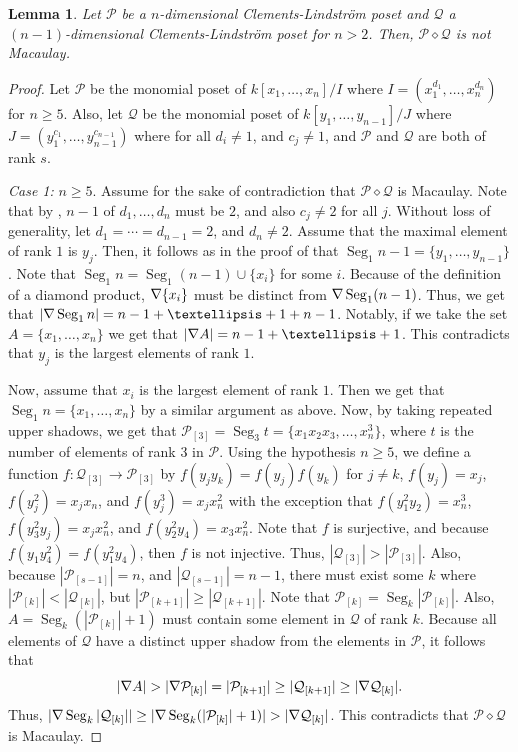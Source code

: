 \documentclass[10pt,a4paper]{amsart}
\newtheorem{lem}{Lemma}
\renewcommand{\P}{{\mathcal P}}
\newcommand{\Q}{{\mathcal Q}}
\def\Seg{\operatorname{Seg}}
\newcommand{\uSdw}{\rotatebox[origin=c]{180}{$\Delta$}}
\begin{document}
\begin{lem} \label{lem: geq 5 not Mac}
Let $\P$ be a $n$-dimensional Clements-Lindstr\"om poset and $\Q$ a $(n - 1)$-dimensional Clements-Lindstr\"om poset for $n >2$. Then, $\P \diamond \Q$ is not Macaulay.
\end{lem}

\begin{proof}
Let $\P$ be the monomial poset of $k[x_1,\dots,x_n]/I$ where $I = (x_1^{d_1},\dots,x_n^{d_n})$ for $n \geq 5$. Also, let $\Q$ be the monomial poset of $k[y_1,\dots,y_{n-1}]/J$ where $J = (y_1^{c_1},\dots,y_{n-1}^{c_{n-1}})$ where for all $d_i \neq 1$, and $c_j \neq 1$, and $\P$ and $\Q$ are both of rank $s$. 
    
\emph{Case 1:} $n \geq 5$. 
Assume for the sake of contradiction that $\P \diamond \Q$ is Macaulay. Note that by , $n-1$ of $d_1,\dots,d_n$ must be $2$, and also $c_j \neq 2$ for all $j$. Without loss of generality, let $d_1=\cdots=d_{n-1} = 2$, and $d_n \neq 2$. Assume that the maximal element of rank $1$ is $y_j$. Then, it follows as in the proof of  that $\Seg_1 n-1 = \{y_1,\dots,y_{n-1}\}$. Note that $\Seg_1 n = \Seg_1 (n-1) \cup \{x_i\}$ for some $i$. Because of the definition of a diamond product, $\uSdw \{x_i\}$ must be distinct from $\uSdw \Seg_1 (n-1)$. Thus, we get that $|\uSdw \Seg_1 n| = n - 1 + \dots + 1 + n - 1$. Notably, if we take the set $A = \{x_1,\dots,x_n\}$ we get that $|\uSdw A| = n-1 + \dots + 1$. This contradicts that $y_j$ is the largest elements of rank $1$.
    
Now, assume that $x_i$ is the largest element of rank $1$.  Then we get that $\Seg_1 n = \{x_1, \dots, x_n\}$ by a similar argument as above. Now, by taking repeated upper shadows, we get that $\P_{[3]} = \Seg_3 t = \{x_1x_2x_3,\dots,x_n^3\}$, where $t$ is the number of elements of rank $3$ in $\P$. 
Using the hypothesis $n\geq 5$, we define a function $f: \Q_{[3]} \to \P_{[3]}$ by $f(y_jy_k) = f(y_j)f(y_k)$ for $j \neq k$, $f(y_j) = x_j$, $f(y_j^2) = x_jx_n$, and $f(y_j^3) = x_jx_n^2$ with the exception that $f(y_1^2y_2) = x_n^3$, $f(y_3^2y_j) = x_jx^2_n$, and $f(y_2^2y_4) = x_3x_n^2$. Note that $f$ is surjective, and because $f(y_1y_4^2) = f(y_1^2y_4)$, then $f$ is not injective. Thus, 
$|\Q_{[3]}| > |\P_{[3]}|$. Also, because $|\P_{[s-1]}| = n$, and $|\Q_{[s-1]}| = n-1$, there must exist some $k$ where $|\P_{[k]}| < |\Q_{[k]}|$, but $|\P_{[k+1]}| \geq |\Q_{[k+1]}|$. Note that $\P_{[k]} = \Seg_k |\P_{[k]}|$. Also,  $A= \Seg_k (|\P_{[k]}| + 1)$ must contain some element in $\Q$ of rank $k$. Because all elements of $\Q$ have a distinct upper shadow from the elements in $\P$, it follows that 
\begin{equation*}
|\uSdw A| > |\uSdw \P_{[k]}| =|\P_{[k+1]}|\geq  |\Q_{[k+1]}| \geq |\uSdw \Q_{[k]}|.
\end{equation*}
Thus, $|\uSdw \Seg_k |\Q_{[k]}|| \geq |\uSdw \Seg_k (|\P_{[k]}| + 1)| > |\uSdw \Q_{[k]}|$. This contradicts that $\P \diamond \Q$ is Macaulay.
      

\end{proof}
\end{document}
